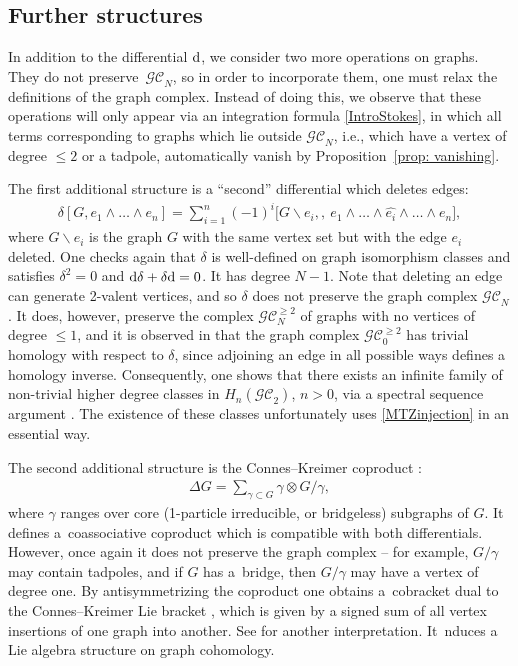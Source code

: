 \documentclass[pdftex]{sigma}%
\numberwithin{equation}{section}
\newcommand{\GC}{\mathcal{GC}}
\newcommand{\0}{\color{blue}{\mathsf{0}}}
\begin{document}
\subsection{Further structures} \label{sect: FurtherStructures}
In addition to the differential ${\rm d}$, we consider two more operations on graphs. They do not preserve~$\GC_N$, so in order to incorporate them, one must relax the definitions of the graph complex. Instead of doing this, we observe that these operations will only appear via an integration formula \eqref{IntroStokes}, in which all terms corresponding to graphs which lie outside $\GC_N$, i.e., which have a vertex of degree $\leq 2$ or a tadpole, automatically vanish by Proposition~\ref{prop: vanishing}.

The first additional structure is a ``second'' differential which deletes edges:
\begin{gather} \label{deltadef}
\delta [ G , e_1\wedge \dots \wedge e_n] = \sum_{i=1}^n (-1)^i \big[ G\backslash e_i,, \ e_1\wedge \dots \wedge \widehat{e_i} \wedge \dots \wedge e_n\big],
\end{gather}
where $G \backslash e_i$ is the graph $G$ with the same vertex set but with the edge $e_i$ deleted. One checks again that $\delta$ is well-defined on graph isomorphism classes and satisfies $\delta^2=0$ and ${\rm d} \delta+ \delta {\rm d} =0$. It has degree $N-1$.
Note that deleting an edge can generate 2-valent vertices, and so $\delta$ does not preserve the graph complex $\GC_N$.
It does, however, preserve the complex $\GC_N^{\geq 2}$ of graphs with no vertices of degree $\leq 1$, and it is
observed in \cite{SpectralSequenceGC2} that the graph complex $\GC_0^{\geq 2}$ has trivial homology with respect to $\delta$, since adjoining an edge in all possible ways defines a homology inverse.
Consequently, one shows that there exists an infinite family of non-trivial higher degree classes in $H_n(\GC_2)$, $n>0$, via a spectral sequence argument \cite{SpectralSequenceGC2}. The existence of these classes unfortunately uses \eqref{MTZinjection} in an essential way.

The second additional structure is the Connes--Kreimer coproduct \cite{ConnesKreimer}:
\begin{gather} \label{DeltaCK}
\Delta G = \sum_{\gamma \subset G} \gamma \otimes G/\gamma ,
\end{gather}
where $\gamma$ ranges over core (1-particle irreducible, or bridgeless) subgraphs of $G$. It defines a~coassociative coproduct which is compatible with both differentials. However, once again it does not preserve the graph complex -- for example, $G/\gamma$ may contain tadpoles, and if $G$ has a~bridge, then $G/\gamma$ may have a vertex of degree one. By antisymmetrizing the coproduct one obtains a~cobracket dual
 to the Connes--Kreimer Lie bracket \cite{ConnesKreimer}, which is given
by a signed sum of all vertex insertions of one graph into another. See \cite[Section~6.9]{FeynmanCat} for another interpretation. It~nduces a Lie algebra structure on graph cohomology.
\end{document}
